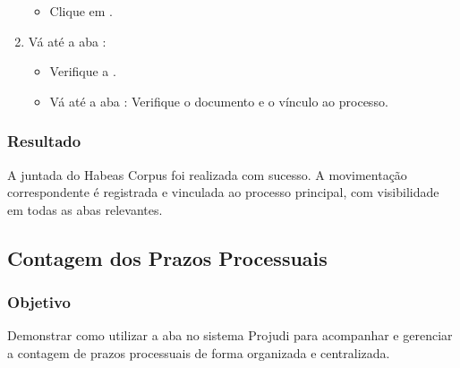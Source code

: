 \documentclass[letterpaper,10pt,brazil]{sphinxmanual}
\begin{document}
\begin{enumerate}
\begin{itemize}
\end{itemize}
\begin{itemize}
\item {} 
\sphinxAtStartPar
Clique em .

\end{itemize}

\item {} 
\sphinxAtStartPar
{}
\sphinxhyphen{} Vá até a aba :
\begin{itemize}
\item {} 
\sphinxAtStartPar
Verifique a .

\end{itemize}
\begin{itemize}
\item {} 
\sphinxAtStartPar
Vá até a aba :
\sphinxhyphen{} Verifique o documento e o vínculo ao processo.

\end{itemize}

\end{enumerate}


\subsubsection{Resultado}
\label{\detokenize{projud_59_juntadahabeascorpus:resultado}}
\sphinxAtStartPar
A juntada do Habeas Corpus foi realizada com sucesso. A movimentação correspondente é registrada e vinculada ao processo principal, com visibilidade em todas as abas relevantes.

\sphinxstepscope


\subsection{Contagem dos Prazos Processuais}
\label{\detokenize{projud_60_contagemprazosprocessuais:contagem-dos-prazos-processuais}}\label{\detokenize{projud_60_contagemprazosprocessuais::doc}}

\subsubsection{Objetivo}
\label{\detokenize{projud_60_contagemprazosprocessuais:objetivo}}
\sphinxAtStartPar
Demonstrar como utilizar a aba  no sistema Projudi para acompanhar e gerenciar a contagem de prazos processuais de forma organizada e centralizada.
\end{document}
